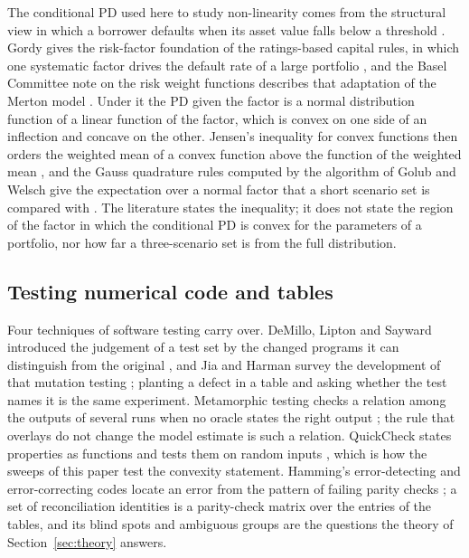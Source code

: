 The conditional PD used here to study non-linearity comes from the structural view in which a borrower defaults when its asset value falls below a threshold \citep{merton1974}.
Gordy gives the risk-factor foundation of the ratings-based capital rules, in which one systematic factor drives the default rate of a large portfolio \citep{gordy2003}, and the Basel Committee note on the risk weight functions describes that adaptation of the Merton model \citep{bcbs2005}.
Under it the PD given the factor is a normal distribution function of a linear function of the factor, which is convex on one side of an inflection and concave on the other.
Jensen's inequality for convex functions then orders the weighted mean of a convex function above the function of the weighted mean \citep{jensen1906}, and the Gauss quadrature rules computed by the algorithm of Golub and Welsch give the expectation over a normal factor that a short scenario set is compared with \citep{golubwelsch1969}.
The literature states the inequality; it does not state the region of the factor in which the conditional PD is convex for the parameters of a portfolio, nor how far a three-scenario set is from the full distribution.

\subsection{Testing numerical code and tables}
\label{sec:rw-testing}

Four techniques of software testing carry over.
DeMillo, Lipton and Sayward introduced the judgement of a test set by the changed programs it can distinguish from the original \citep{demillo1978}, and Jia and Harman survey the development of that mutation testing \citep{jia2011}; planting a defect in a table and asking whether the test names it is the same experiment.
Metamorphic testing checks a relation among the outputs of several runs when no oracle states the right output \citep{chen2018,segura2016}; the rule that overlays do not change the model estimate is such a relation.
QuickCheck states properties as functions and tests them on random inputs \citep{claessen2000}, which is how the sweeps of this paper test the convexity statement.
Hamming's error-detecting and error-correcting codes locate an error from the pattern of failing parity checks \citep{hamming1950}; a set of reconciliation identities is a parity-check matrix over the entries of the tables, and its blind spots and ambiguous groups are the questions the theory of Section~\ref{sec:theory} answers.

